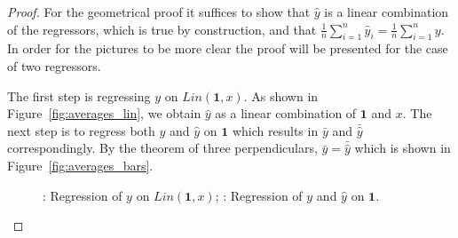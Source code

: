 \begin{proof}
For the geometrical proof it suffices to show that $\hat y$ is a linear combination of the regressors, which is true by construction,
and that $\frac{1}{n} \sum_{i=1}^{n} \hat y_i = \frac{1}{n} \sum_{i=1}^{n} y$. In order for the pictures to be more clear the proof will be presented for the case of two regressors.

The first step is regressing $y$ on $Lin(\mathbf{1}, x)$. As shown in Figure~\ref{fig:averages_lin}, we obtain $\hat y$ as a linear combination of $\mathbf{1}$ and $x$.
The next step is to regress both $y$ and $\hat y$ on $\mathbf{1}$ which results in $\bar y$ and $\bar \hat y$ correspondingly.
By the theorem of three perpendiculars, $\bar y = \bar \hat y$ which is shown in Figure~\ref{fig:averages_bars}.

\begin{figure}[ht!]
\begin{center}
\hspace{4ex}
\caption{: Regression of $y$ on $Lin(\mathbf{1},x)$; : Regression of $y$ and $\hat y$ on $\mathbf{1}$.}
\end{center}
\end{figure}
\end{proof}


